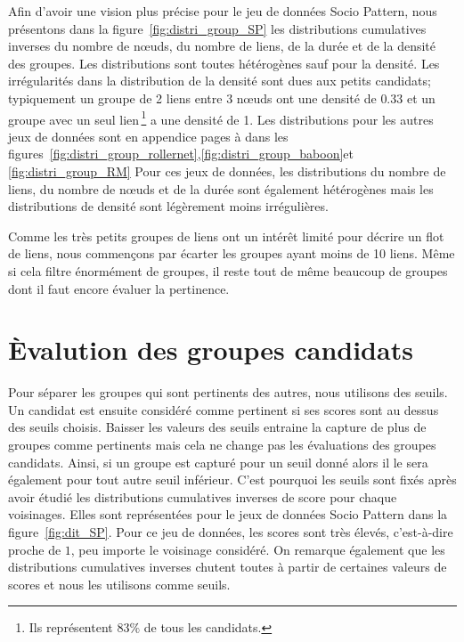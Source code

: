 Afin d'avoir une vision plus précise pour le jeu de données Socio Pattern, nous présentons dans la figure~\ref{fig:distri_group_SP} les distributions cumulatives inverses du nombre de n\oe uds, du nombre de liens, de la durée et de la densité des groupes.
Les distributions sont toutes hétérogènes sauf pour la densité.
Les irrégularités dans la distribution de la densité sont dues aux petits candidats; typiquement un groupe de 2 liens entre 3 n\oe uds ont une densité de $0.33$ et un groupe avec un seul lien\,\footnote{Ils représentent $83\%$ de tous les candidats.} a une densité de 1.
Les distributions pour les autres jeux de données sont en appendice pages \pageref{fig:distri_group_rollernet} à \pageref{fig:distri_group_RM} dans les figures~\ref{fig:distri_group_rollernet},\ref{fig:distri_group_baboon}et \ref{fig:distri_group_RM}
Pour ces jeux de données, les distributions du nombre de liens, du nombre de n\oe uds et de la durée sont également hétérogènes mais les distributions de densité sont légèrement moins irrégulières.


Comme les très petits groupes de liens ont un intérêt limité pour décrire un flot de liens, nous commençons par écarter les groupes ayant moins de 10 liens.
Même si cela filtre énormément de groupes, il reste tout de même beaucoup de groupes dont il faut encore évaluer la pertinence.




\section{\`Evalution des groupes candidats}

Pour séparer les groupes qui sont pertinents des autres, nous utilisons des seuils.
Un candidat est ensuite considéré comme pertinent si ses scores sont au dessus des seuils choisis.
Baisser les valeurs des seuils entraine la capture de plus de groupes comme pertinents mais cela ne change pas les évaluations des groupes candidats.
Ainsi, si un groupe est capturé pour un seuil donné alors il le sera également pour tout autre seuil inférieur.
C'est pourquoi les seuils sont fixés après avoir étudié les distributions cumulatives inverses de score pour chaque voisinages.
Elles sont représentées pour le jeux de données Socio Pattern dans la figure~\ref{fig:dit_SP}.
Pour ce jeu de données, les scores sont très élevés, c'est-à-dire proche de $1$, peu importe le voisinage considéré.
On remarque également que les distributions cumulatives inverses chutent toutes à partir de certaines valeurs de scores et nous les utilisons comme seuils.

